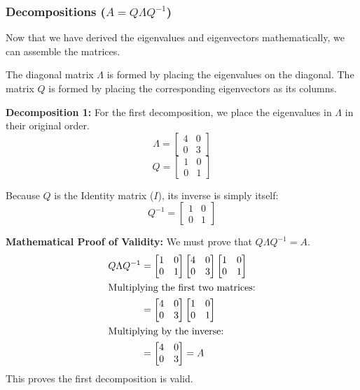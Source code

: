\documentclass[twoside, 10pt]{article}
\begin{document}
\subsubsection{Decompositions ($A = Q \Lambda Q^{-1}$)}
Now that we have derived the eigenvalues and eigenvectors mathematically, we can assemble the matrices. 

The diagonal matrix $\Lambda$ is formed by placing the eigenvalues on the diagonal. The matrix $Q$ is formed by placing the corresponding eigenvectors as its columns.

\textbf{Decomposition 1:} For the first decomposition, we place the eigenvalues in $\Lambda$ in their original order.
\[ \Lambda = \begin{bmatrix} 4 & 0 \\ 0 & 3 \end{bmatrix} \]
\[ Q = \begin{bmatrix} 1 & 0 \\ 0 & 1 \end{bmatrix} \]

Because $Q$ is the Identity matrix ($I$), its inverse is simply itself:
\[ Q^{-1} = \begin{bmatrix} 1 & 0 \\ 0 & 1 \end{bmatrix} \]

\textbf{Mathematical Proof of Validity:} We must prove that $Q \Lambda Q^{-1} = A$.
\begin{align*}
Q \Lambda Q^{-1} &= \begin{bmatrix} 1 & 0 \\ 0 & 1 \end{bmatrix} \begin{bmatrix} 4 & 0 \\ 0 & 3 \end{bmatrix} \begin{bmatrix} 1 & 0 \\ 0 & 1 \end{bmatrix} \\
\intertext{Multiplying the first two matrices:}
&= \begin{bmatrix} 4 & 0 \\ 0 & 3 \end{bmatrix} \begin{bmatrix} 1 & 0 \\ 0 & 1 \end{bmatrix} \\
\intertext{Multiplying by the inverse:}
&= \begin{bmatrix} 4 & 0 \\ 0 & 3 \end{bmatrix} = A
\end{align*}
This proves the first decomposition is valid.
\end{document}
